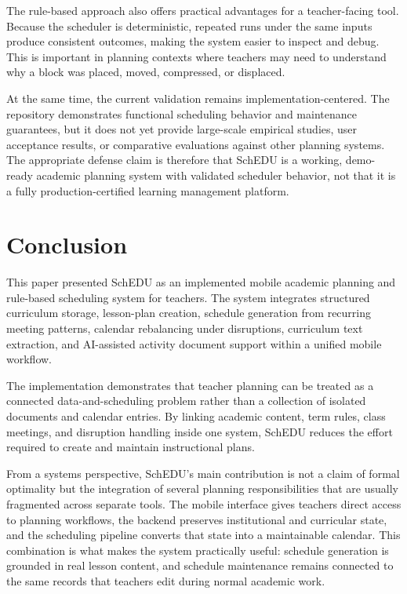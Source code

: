 \documentclass[conference]{IEEEtran}
\begin{document}
The rule-based approach also offers practical advantages for a teacher-facing tool.
Because the scheduler is deterministic, repeated runs under the same inputs produce
consistent outcomes, making the system easier to inspect and debug. This is
important in planning contexts where teachers may need to understand why a block was
placed, moved, compressed, or displaced.

At the same time, the current validation remains implementation-centered. The
repository demonstrates functional scheduling behavior and maintenance guarantees,
but it does not yet provide large-scale empirical studies, user acceptance results,
or comparative evaluations against other planning systems. The appropriate defense
claim is therefore that SchEDU is a working, demo-ready academic planning system
with validated scheduler behavior, not that it is a fully production-certified
learning management platform.

\section{Conclusion}

This paper presented SchEDU as an implemented mobile academic planning and
rule-based scheduling system for teachers. The system integrates structured
curriculum storage, lesson-plan creation, schedule generation from recurring
meeting patterns, calendar rebalancing under disruptions, curriculum text
extraction, and AI-assisted activity document support within a unified mobile
workflow.

The implementation demonstrates that teacher planning can be treated as a connected
data-and-scheduling problem rather than a collection of isolated documents and
calendar entries. By linking academic content, term rules, class meetings, and
disruption handling inside one system, SchEDU reduces the effort required to create
and maintain instructional plans.

From a systems perspective, SchEDU's main contribution is not a claim of formal
optimality but the integration of several planning responsibilities that are usually
fragmented across separate tools. The mobile interface gives teachers direct access
to planning workflows, the backend preserves institutional and curricular state, and
the scheduling pipeline converts that state into a maintainable calendar. This
combination is what makes the system practically useful: schedule generation is
grounded in real lesson content, and schedule maintenance remains connected to the
same records that teachers edit during normal academic work.
\end{document}
